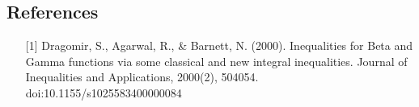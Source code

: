 \documentclass[10pt,twocolumn,letterpaper]{article}
\begin{document}
 



\subsection{References}

\begin{itemize}
\item[][1] Dragomir, S., Agarwal, R., \& Barnett, N. (2000). Inequalities for Beta and Gamma functions via some classical and new integral inequalities. Journal of Inequalities and Applications, 2000(2), 504054. doi:10.1155/s1025583400000084
\end{itemize}




{\small


}
\end{document}
